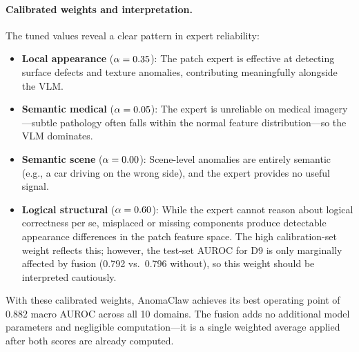 \paragraph{Calibrated weights and interpretation.}
The tuned values reveal a clear pattern in expert reliability:
\begin{itemize}[leftmargin=*,itemsep=1pt]
    \item \textbf{Local appearance} ($\alpha = 0.35$): The patch expert is effective at detecting surface defects and texture anomalies, contributing meaningfully alongside the VLM.
    \item \textbf{Semantic medical} ($\alpha = 0.05$): The expert is unreliable on medical imagery---subtle pathology often falls within the normal feature distribution---so the VLM dominates.
    \item \textbf{Semantic scene} ($\alpha = 0.00$): Scene-level anomalies are entirely semantic (e.g., a car driving on the wrong side), and the expert provides no useful signal.
    \item \textbf{Logical structural} ($\alpha = 0.60$): While the expert cannot reason about logical correctness per se, misplaced or missing components produce detectable appearance differences in the patch feature space. The high calibration-set weight reflects this; however, the test-set AUROC for D9 is only marginally affected by fusion (0.792 vs.\ 0.796 without), so this weight should be interpreted cautiously.
\end{itemize}
With these calibrated weights, AnomaClaw achieves its best operating point of $0.882$ macro AUROC across all 10 domains.
The fusion adds no additional model parameters and negligible computation---it is a single weighted average applied after both scores are already computed.
